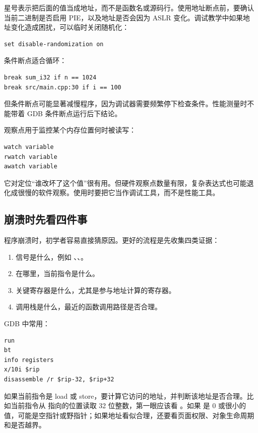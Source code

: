 星号表示把后面的值当成地址，而不是函数名或源码行。使用地址断点前，要确认当前二进制是否启用 PIE，以及地址是否会因为 ASLR 变化。调试教学中如果地址变化造成困扰，可以临时关闭随机化：

\begin{lstlisting}
set disable-randomization on
\end{lstlisting}

条件断点适合循环：

\begin{lstlisting}
break sum_i32 if n == 1024
break src/main.cpp:30 if i == 100
\end{lstlisting}

但条件断点可能显著减慢程序，因为调试器需要频繁停下检查条件。性能测量时不能带着 GDB 条件断点运行后下结论。

观察点用于监控某个内存位置何时被读写：

\begin{lstlisting}
watch variable
rwatch variable
awatch variable
\end{lstlisting}

它对定位“谁改坏了这个值”很有用。但硬件观察点数量有限，复杂表达式也可能退化成很慢的软件观察。使用时要把它当作调试工具，而不是性能工具。

\subsection{崩溃时先看四件事}

程序崩溃时，初学者容易直接猜原因。更好的流程是先收集四类证据：

\begin{enumerate}
  \item 信号是什么，例如 、、。
  \item {} 在哪里，当前指令是什么。
  \item 关键寄存器是什么，尤其是参与地址计算的寄存器。
  \item 调用栈是什么，最近的函数调用路径是否合理。
\end{enumerate}

GDB 中常用：

\begin{lstlisting}
run
bt
info registers
x/10i $rip
disassemble /r $rip-32, $rip+32
\end{lstlisting}

如果当前指令是 load 或 store，要计算它访问的地址，并判断该地址是否合理。比如当前指令从  指向的位置读取 32 位整数，第一眼应该看 。如果  是 0 或很小的值，可能是空指针或野指针；如果地址看似合理，还要看页面权限、对象生命周期和是否越界。

